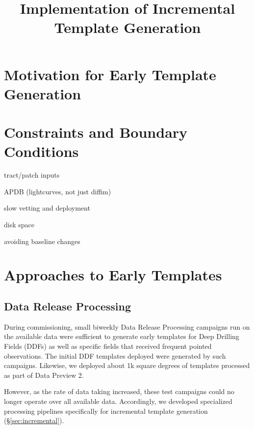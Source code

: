 \documentclass[DM,lsstdraft,authoryear,toc]{lsstdoc}
\title{Implementation of Incremental Template Generation}
\date{\vcsDate}
\begin{document}
\maketitle


\section{Motivation for Early Template Generation} \label{sec:motivation}


\section{Constraints and Boundary Conditions} \label{sec: constraints}

tract/patch inputs

APDB (lightcurves, not just diffim)

slow vetting and deployment

disk space

avoiding baseline changes

\section{Approaches to Early Templates} \label{sec:approaches}

\subsection{Data Release Processing} \label{sec:drp}

During commissioning, small biweekly Data Release Processing campaigns run on the available data were sufficient to generate early templates for Deep Drilling Fields (DDFs) as well as specific fields that received frequent pointed observations.
The initial DDF templates deployed were generated by such campaigns.
Likewise, we deployed about 1k square degrees of templates processed as part of Data Preview 2.

However, as the rate of data taking increased, these test campaigns could no longer operate over all available data.
Accordingly, we developed specialized processing pipelines specifically for incremental template generation (\S \ref{sec:incremental}).
\end{document}
